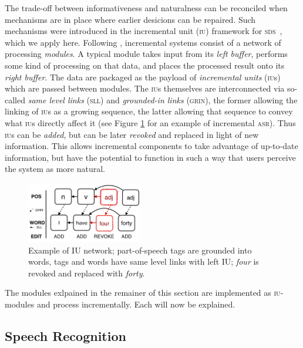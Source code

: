 \documentclass[11pt]{article}
\newcommand{\sds}[0]{\textsc{sds}}
\newcommand{\asr}[0]{\textsc{asr}}
\newcommand{\iu}[0]{\textsc{iu}}
\begin{document}
The trade-off between informativeness and naturalness can be reconciled when mechanisms are in place where earlier desicions can be repaired. Such mechanisms were introduced in the incremental unit (\iu) framework for \sds\ \cite{Schlangen2011}, which we apply here. Following , incremental systems consist of a network of processing \emph{modules}. A typical module takes input from its \emph{left buffer}, performs some kind of processing on that data, and places the processed result onto its \emph{right buffer}. The data are packaged as the payload of \emph{incremental units} (\textsc{iu}s) which are passed between modules. The \textsc{iu}s themselves are interconnected via so-called \emph{same level links} (\textsc{sll}) and \emph{grounded-in links} (\textsc{grin}), the former allowing the linking of \textsc{iu}s as a growing sequence, the latter allowing that sequence to convey what \textsc{iu}s directly affect it (see Figure \ref{fig:iu_example} for an example of incremental \asr). Thus \iu s can be \emph{added}, but can be later \emph{revoked} and replaced in light of new information. This allows incremental components to take advantage of up-to-date information, but have the potential to function in such a way that users perceive the system as more natural.

\begin{figure} %
  \centering
      \includegraphics[width=0.45\textwidth]{figures/005_iu_example.png}	
      \caption{Example of IU network; part-of-speech tags are grounded into words, tags and words have same level links with left IU; \emph{four} is revoked and replaced with \emph{forty}.\label{fig:iu_example}}
            \vspace{-0.25cm}
\end{figure}

The modules exlpained in the remainer of this section are implemented as \iu-modules and process incrementally. Each will now be explained. 

\subsection{Speech Recognition}
\end{document}

